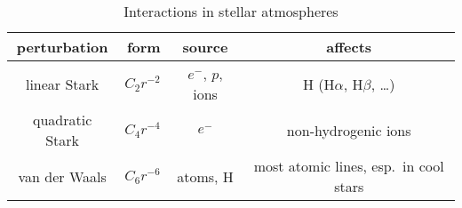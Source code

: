 \begin{table}[htbp]
\caption{Interactions in stellar atmospheres}\label{t.perturbers}
\begin{tabular}{crcc}
\hline
perturbation & form & source & affects\\
\hline\hline
linear Stark & $C_{2} r^{-2}$ & $e^{-}$, $p$, ions & H (H$\alpha$, H$\beta$, \ldots)\\
quadratic Stark & $C_{4} r^{-4}$ & $e^{-}$ & non-hydrogenic ions\\
van der Waals & $C_{6}r^{-6}$ & atoms, H & most atomic lines, esp.\ in cool stars\\
\hline
\end{tabular}
\end{table}
